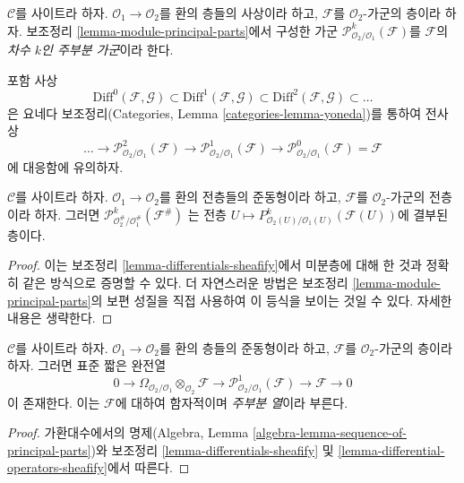 \begin{definition}
\label{definition-module-principal-parts}
$\mathcal{C}$를 사이트라 하자.
$\mathcal{O}_1 \to \mathcal{O}_2$를 환의 층들의 사상이라 하고,
$\mathcal{F}$를 $\mathcal{O}_2$-가군의 층이라 하자.
보조정리 \ref{lemma-module-principal-parts}에서 구성한 가군
$\mathcal{P}^k_{\mathcal{O}_2/\mathcal{O}_1}(\mathcal{F})$를
$\mathcal{F}$의 {\it 차수 $k$인 주부분 가군}이라 한다.
\end{definition}

\noindent
포함 사상
$$
\text{Diff}^0(\mathcal{F}, \mathcal{G}) \subset
\text{Diff}^1(\mathcal{F}, \mathcal{G}) \subset
\text{Diff}^2(\mathcal{F}, \mathcal{G}) \subset \ldots
$$
은 요네다 보조정리(Categories, Lemma \ref{categories-lemma-yoneda})를
통하여 전사상
$$
\ldots \to \mathcal{P}^2_{\mathcal{O}_2/\mathcal{O}_1}(\mathcal{F})
\to \mathcal{P}^1_{\mathcal{O}_2/\mathcal{O}_1}(\mathcal{F})
\to \mathcal{P}^0_{\mathcal{O}_2/\mathcal{O}_1}(\mathcal{F}) = \mathcal{F}
$$
에 대응함에 유의하자.

\begin{lemma}
\label{lemma-differential-operators-sheafify}
$\mathcal{C}$를 사이트라 하자. $\mathcal{O}_1 \to \mathcal{O}_2$를
환의 전층들의 준동형이라 하고, $\mathcal{F}$를
$\mathcal{O}_2$-가군의 전층이라 하자. 그러면
$\mathcal{P}^k_{\mathcal{O}_2^\#/\mathcal{O}_1^\#}(\mathcal{F}^\#)$
는 전층
$U \mapsto P^k_{\mathcal{O}_2(U)/\mathcal{O}_1(U)}(\mathcal{F}(U))$에
결부된 층이다.
\end{lemma}

\begin{proof}
이는 보조정리 \ref{lemma-differentials-sheafify}에서 미분층에 대해 한 것과
정확히 같은 방식으로 증명할 수 있다. 더 자연스러운 방법은 보조정리
\ref{lemma-module-principal-parts}의 보편 성질을 직접 사용하여 이 등식을
보이는 것일 수 있다. 자세한 내용은 생략한다.
\end{proof}

\begin{lemma}
\label{lemma-sequence-of-principal-parts}
$\mathcal{C}$를 사이트라 하자. $\mathcal{O}_1 \to \mathcal{O}_2$를
환의 층들의 준동형이라 하고, $\mathcal{F}$를
$\mathcal{O}_2$-가군의 층이라 하자. 그러면 표준 짧은 완전열
$$
0 \to
\Omega_{\mathcal{O}_2/\mathcal{O}_1} \otimes_{\mathcal{O}_2} \mathcal{F} \to
\mathcal{P}^1_{\mathcal{O}_2/\mathcal{O}_1}(\mathcal{F}) \to
\mathcal{F} \to 0
$$
이 존재한다. 이는 $\mathcal{F}$에 대하여 함자적이며
{\it 주부분 열}이라 부른다.
\end{lemma}

\begin{proof}
가환대수에서의 명제(Algebra, Lemma
\ref{algebra-lemma-sequence-of-principal-parts})와 보조정리
\ref{lemma-differentials-sheafify} 및
\ref{lemma-differential-operators-sheafify}에서 따른다.
\end{proof}

